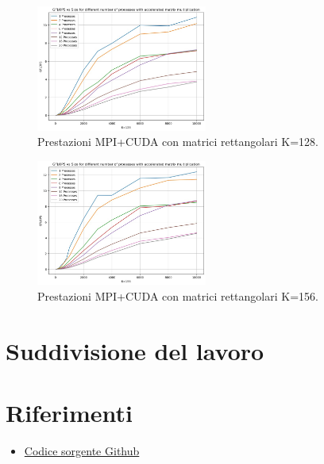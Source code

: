 \documentclass[conference]{IEEEtran}
\begin{document}
\begin{figure}[H]
    \centering
    \includegraphics[width=0.5\textwidth]{resources/mpi_cuda_128.jpg}
    \caption{Prestazioni MPI+CUDA con matrici rettangolari K=128.}
    \label{fig:mpi_cuda_128}
\end{figure}
\begin{figure}[H]
    \centering
    \includegraphics[width=0.5\textwidth]{resources/mpi_cuda_156.jpg}
    \caption{Prestazioni MPI+CUDA con matrici rettangolari K=156.}
    \label{fig:mpi_cuda_156}
\end{figure}
\section{Suddivisione del lavoro}
\section{Riferimenti}
\begin{itemize}
    \item \href{https://github.com/LucaFalasca/ParallelMatrixMultiplication}{Codice sorgente Github}
\end{itemize}
\vspace{12pt}
\end{document}
